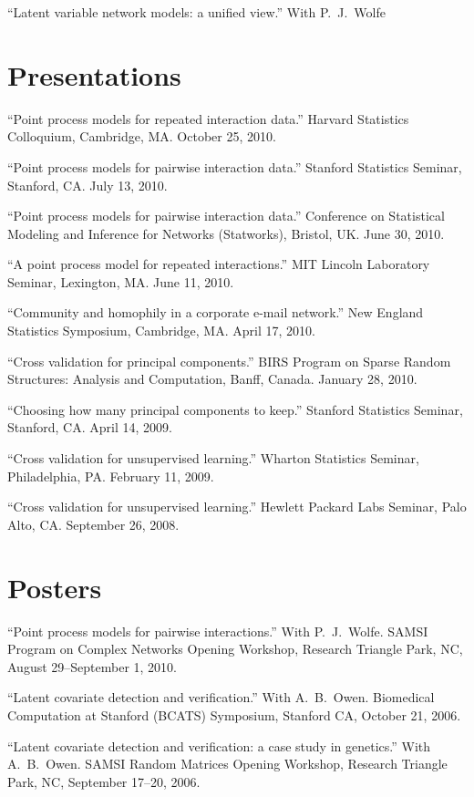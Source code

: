 \documentclass[overlapped,line,letterpaper]{res}
\begin{document}
\begin{resume}
``Latent variable network models: a unified view.''
With P.\ J.\ Wolfe


\section{\bf Presentations}

``Point process models for repeated interaction data.''
Harvard Statistics Colloquium, Cambridge, MA.  October 25, 2010.

``Point process models for pairwise interaction data.''
Stanford Statistics Seminar, Stanford, CA.  July 13, 2010.

``Point process models for pairwise interaction data.''
Conference on Statistical Modeling and Inference for Networks (Statworks), 
Bristol, UK.  June 30, 2010.

``A point process model for repeated interactions.''
MIT Lincoln Laboratory Seminar, Lexington, MA. June 11, 2010.

``Community and homophily in a corporate e-mail network.''
New England Statistics Symposium, Cambridge, MA.  April 17, 2010.

``Cross validation for principal components.''
BIRS Program on Sparse Random Structures: Analysis and Computation,
Banff, Canada.
January 28, 2010.

``Choosing how many principal components to keep.''
Stanford Statistics Seminar, Stanford, CA.  April 14, 2009.

``Cross validation for unsupervised learning.''
Wharton Statistics Seminar, Philadelphia, PA.  February 11, 2009.

``Cross validation for unsupervised learning.''
Hewlett Packard Labs Seminar, Palo Alto, CA.  September 26, 2008.


\section{\bf Posters}

``Point process models for pairwise interactions.''
With P.\ J.\ Wolfe.
SAMSI Program on Complex Networks Opening Workshop,
Research Triangle Park, NC,
August 29--September 1, 2010.

``Latent covariate detection and verification.''
With A.\ B.\ Owen.
Biomedical Computation at Stanford (BCATS) Symposium,
Stanford CA,
October 21, 2006.

``Latent covariate detection and verification: a case study in genetics.''
With A.\ B.\ Owen.
SAMSI Random Matrices Opening Workshop,
Research Triangle Park, NC,
September 17--20, 2006.



\end{resume}
\end{document}
